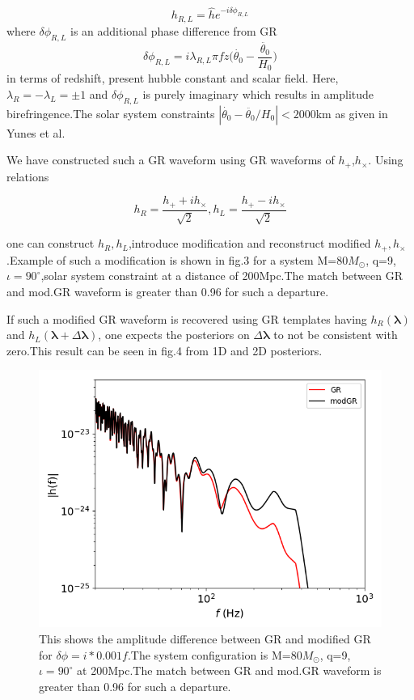\documentclass[prd,preprintnumbers,twocolumn,eqsecnum,floatfix,a4paper,nofootinbib,superscriptaddress]{revtex4}
\newcommand{\blambda}{\bm{\lambda}}
\begin{document}
\begin{equation}
h_{R,L}=\hat{h}e^{-i\delta \phi_{R,L}}
\end{equation}
where $\delta \phi_{R,L}$ is an additional phase difference from GR
\begin{equation}
\delta \phi_{R,L}=i\lambda_{R,L} \pi f z\Big(\dot{\theta_0}-\frac{\ddot{\theta_0}}{H_0}\Big)
\end{equation}
in terms of redshift, present hubble constant and scalar field. Here, $\lambda_{R}=-\lambda_{L}=\pm1$ and $\delta \phi_{R,L}$ is purely imaginary which results in amplitude birefringence.The solar system constraints $|\dot{\theta_0}-\ddot{\theta_0}/{H_0}|<2000$km as given in Yunes et al.

We have constructed such a GR waveform using GR waveforms of $h_+$,$h_{\times}$. Using relations

\begin{equation}
h_R=\frac{h_++ih_{\times}}{\sqrt{2}},h_L=\frac{h_+-ih_{\times}}{\sqrt{2}}
\end{equation}

one can construct $h_R,h_L$,introduce modification and reconstruct modified $h_+,h_{\times}$.Example of such a modification is shown in fig.3 for a system M=80$M_{\odot}$, q=9, $\iota=90^{\circ}$,solar system constraint at a distance of 200Mpc.The match between GR and mod.GR waveform is greater than 0.96 for such a departure.

If such a modified GR waveform is recovered using GR templates having $h_R(\blambda)$ and $h_L(\blambda+\Delta \blambda)$, one expects
the posteriors on $\Delta \blambda$ to not be consistent with
zero.This result can be seen in fig.4 from 1D and 2D posteriors.
\begin{figure}[h]
	\includegraphics*[scale=0.5]{./../../plots/kludge_amplitude_birefringence_log_log}
	\caption{This shows the amplitude difference between GR and modified GR for $\delta \phi =i*0.001f$.The system configuration is M=80$M_{\odot}$, q=9, $\iota=90^{\circ}$ at 200Mpc.The match between GR and mod.GR waveform is greater than 0.96 for such a departure.}
\end{figure}
\end{document}

